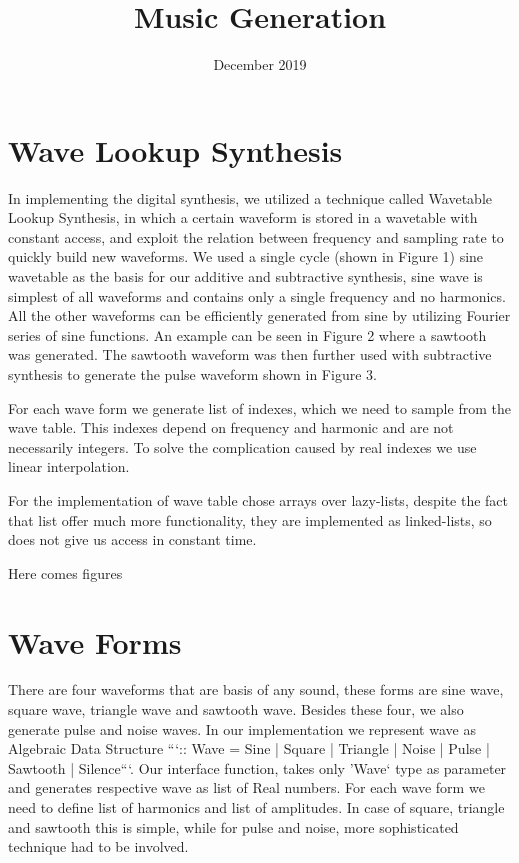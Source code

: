 \documentclass{article}
\title{Music Generation}
\date{December 2019}
\begin{document}
\maketitle

\section{Wave Lookup Synthesis}
In implementing the digital synthesis, we utilized a technique called Wavetable Lookup Synthesis, in
which a certain waveform is stored in a wavetable with constant access, and exploit the relation between
frequency and sampling rate to quickly build new waveforms. We used a single cycle (shown in Figure
1) sine wavetable as the basis for our additive and subtractive synthesis, sine wave is simplest of all waveforms and contains only a single frequency and no harmonics. All the other waveforms can be efficiently generated from sine by utilizing Fourier series of sine functions.  An example can be seen in Figure 2 where a sawtooth was generated. The sawtooth
waveform was then further used with subtractive synthesis to generate the pulse waveform shown in Figure 3. 

For each wave form we generate list of indexes, which we need to sample from the wave table. This indexes depend on frequency and harmonic and are not necessarily integers. To solve the complication caused by real indexes we use linear interpolation. 

For the implementation of wave table chose arrays over lazy-lists, despite the fact that list offer much more functionality, they are implemented as linked-lists, so does not give us access in constant time. 


Here comes figures

\section{Wave Forms}

There are four waveforms that are basis of any sound, these forms are sine wave, square wave, triangle wave and sawtooth wave. Besides these four, we also generate pulse and noise waves.
In our implementation we represent wave as Algebraic Data Structure ```:: Wave = Sine | Square | Triangle | Noise | Pulse | Sawtooth | Silence```. Our interface function, takes only 'Wave` type as parameter and generates respective wave as list of Real numbers.
For each wave form we need to define list of harmonics and list of amplitudes. In case of square, triangle and sawtooth this is simple, while for pulse and noise, more sophisticated technique had to be involved. 
\end{document}
